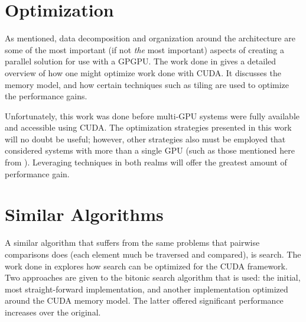 \documentclass[12pt]{ucthesis}
\begin{document}

\section{Optimization}
\label{subsec:opti}
As mentioned, data decomposition and organization around the architecture are
some of the most important (if not \emph{the} most important) aspects of
creating a parallel solution for use with a GPGPU. The work done in
\cite{ryoo2008optimization} gives a detailed overview of how one might optimize
work done with CUDA. It discusses the memory model, and how certain techniques
such as tiling are used to optimize the performance gains.

Unfortunately, this work was done before multi-GPU systems were fully available
and accessible using CUDA. The optimization strategies presented in this work
will no doubt be useful; however, other strategies also must be employed that
considered systems with more than a single GPU (such as those mentioned here
from \cite{thibault2009cuda}). Leveraging techniques in both realms will offer
the greatest amount of performance gain.

\section{Similar Algorithms}
\label{subsec:simialg}
A similar algorithm that suffers from the same problems that pairwise
comparisons does (each element much be traversed and compared), is search. The
work done in \cite{peters2011fast} explores how search can be optimized for the
CUDA framework. Two approaches are given to the bitonic search algorithm that
is used: the initial, most straight-forward implementation, and another
implementation optimized around the CUDA memory model. The latter offered
significant performance increases over the original. 
\end{document}
